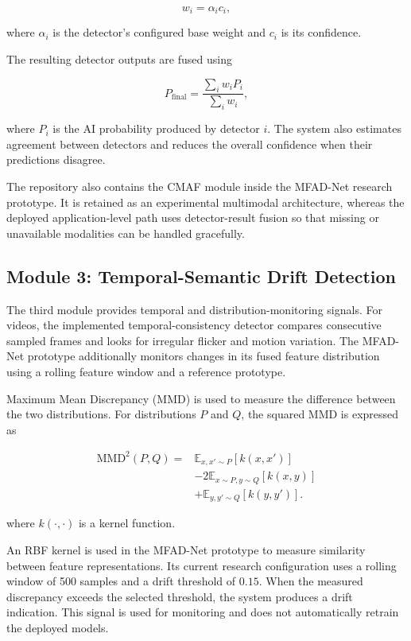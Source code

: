 \documentclass[conference]{IEEEtran}
\begin{document}
\begin{equation}
w_i=\alpha_i c_i,
\end{equation}

where $\alpha_i$ is the detector's configured base weight and $c_i$ is its confidence.

The resulting detector outputs are fused using

\begin{equation}
P_{\mathrm{final}}=\frac{\sum_i w_iP_i}{\sum_i w_i},
\end{equation}

where $P_i$ is the AI probability produced by detector $i$. The system also estimates agreement between detectors and reduces the overall confidence when their predictions disagree.

The repository also contains the CMAF module inside the MFAD-Net research prototype. It is retained as an experimental multimodal architecture, whereas the deployed application-level path uses detector-result fusion so that missing or unavailable modalities can be handled gracefully.

\subsection{Module 3: Temporal-Semantic Drift Detection}

The third module provides temporal and distribution-monitoring signals. For videos, the implemented temporal-consistency detector compares consecutive sampled frames and looks for irregular flicker and motion variation. The MFAD-Net prototype additionally monitors changes in its fused feature distribution using a rolling feature window and a reference prototype.

Maximum Mean Discrepancy (MMD) is used to measure the difference between the two distributions. For distributions $P$ and $Q$, the squared MMD is expressed as

\begin{equation}
\begin{aligned}
\mathrm{MMD}^{2}(P,Q)
={}&
\mathbb{E}_{x,x'\sim P}[k(x,x')]\\
&-2\mathbb{E}_{x\sim P,y\sim Q}[k(x,y)]\\
&+\mathbb{E}_{y,y'\sim Q}[k(y,y')].
\end{aligned}
\end{equation}

where $k(\cdot,\cdot)$ is a kernel function.

An RBF kernel is used in the MFAD-Net prototype to measure similarity between feature representations. Its current research configuration uses a rolling window of 500 samples and a drift threshold of $0.15$. When the measured discrepancy exceeds the selected threshold, the system produces a drift indication. This signal is used for monitoring and does not automatically retrain the deployed models.
\end{document}
